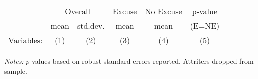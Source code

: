 \begin{table}[!ht]
\centering
\caption{}
\label{}
\vspace*{2mm}
\begin{threeparttable}
\begin{tabular}{lccccc}
\toprule
 & \multicolumn{2}{c}{Overall} & Excuse & No Excuse & p-value \\
 \cmidrule(r){2-3} \cmidrule(lr){4-4} \cmidrule(lr){5-5} \cmidrule(lr){6-6} 
 & mean & std.dev. & mean & mean & (E=NE) \\
 \cmidrule(r){2-2} \cmidrule(lr){3-3} \cmidrule(lr){4-4} \cmidrule(lr){5-5} \cmidrule(l){6-6} 
  Variables: & (1) & (2) & (3) & (4) & (5) \\ \midrule \midrule
 \midrule
\bottomrule
\end{tabular}
\begin{tablenotes}[flushleft] \footnotesize
\item \textit{Notes: }$p$-values based on robust standard errors reported. Attriters dropped from sample.
\end{tablenotes} \end{threeparttable} \end{table}
